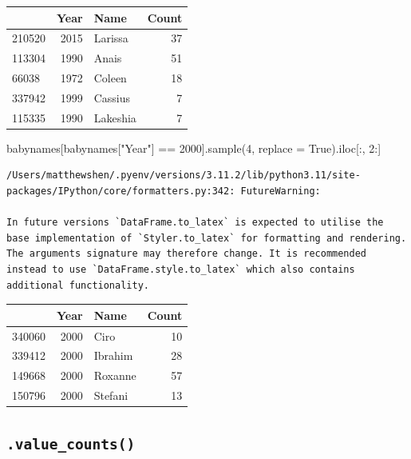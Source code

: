 \documentclass[
  letterpaper,
  DIV=11,
  numbers=noendperiod]{scrreprt}
\newenvironment{Shaded}{\begin{snugshade}}{\end{snugshade}}
\newcommand{\DecValTok}[1]{\textcolor[rgb]{0.68,0.00,0.00}{#1}}
\newcommand{\NormalTok}[1]{\textcolor[rgb]{0.00,0.23,0.31}{#1}}
\newcommand{\OperatorTok}[1]{\textcolor[rgb]{0.37,0.37,0.37}{#1}}
\newcommand{\StringTok}[1]{\textcolor[rgb]{0.13,0.47,0.30}{#1}}
\newcommand{\VariableTok}[1]{\textcolor[rgb]{0.07,0.07,0.07}{#1}}
\begin{document}
\begin{tabular}{lrlr}
\toprule
{} &  Year &      Name &  Count \\
\midrule
210520 &  2015 &   Larissa &     37 \\
113304 &  1990 &     Anais &     51 \\
66038  &  1972 &    Coleen &     18 \\
337942 &  1999 &   Cassius &      7 \\
115335 &  1990 &  Lakeshia &      7 \\
\bottomrule
\end{tabular}

\begin{Shaded}
\begin{Highlighting}[]
\NormalTok{babynames[babynames[}\StringTok{"Year"}\NormalTok{] }\OperatorTok{==} \DecValTok{2000}\NormalTok{].sample(}\DecValTok{4}\NormalTok{, replace }\OperatorTok{=} \VariableTok{True}\NormalTok{).iloc[:, }\DecValTok{2}\NormalTok{:]}
\end{Highlighting}
\end{Shaded}

\begin{verbatim}
/Users/matthewshen/.pyenv/versions/3.11.2/lib/python3.11/site-packages/IPython/core/formatters.py:342: FutureWarning:

In future versions `DataFrame.to_latex` is expected to utilise the base implementation of `Styler.to_latex` for formatting and rendering. The arguments signature may therefore change. It is recommended instead to use `DataFrame.style.to_latex` which also contains additional functionality.
\end{verbatim}

\begin{tabular}{lrlr}
\toprule
{} &  Year &     Name &  Count \\
\midrule
340060 &  2000 &     Ciro &     10 \\
339412 &  2000 &  Ibrahim &     28 \\
149668 &  2000 &  Roxanne &     57 \\
150796 &  2000 &  Stefani &     13 \\
\bottomrule
\end{tabular}

\hypertarget{value_counts}{%
\subsection{\texorpdfstring{\texttt{.value\_counts()}}{.value\_counts()}}\label{value_counts}}
\end{document}
